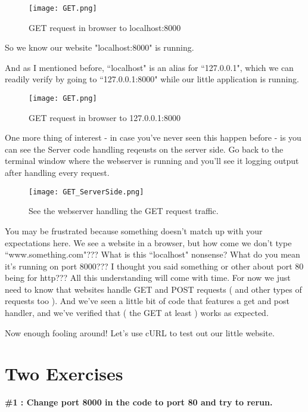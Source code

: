 \documentclass[10pt]{article}
\begin{document}
\begin{figure}[h]
  \centering
    \texttt{[image: GET.png]}
  \caption{GET request in browser to localhost:8000}
\end{figure}

So we know our website "localhost:8000" is running.

And as I mentioned before, ``localhost" is an alias for ``127.0.0.1", which we can readily verify by going to ``127.0.0.1:8000" while our little application is running.

\begin{figure}[h]
  \centering
    \texttt{[image: GET.png]}
  \caption{GET request in browser to 127.0.0.1:8000 }
\end{figure}

One more thing of interest - in case you've never seen this happen before - is you can see the Server code handling reqeusts on the server side. Go back to the terminal window where the webserver is running and you'll see it logging output after handling every request.

\begin{figure}[h]
  \centering
    \texttt{[image: GET\_ServerSide.png]}
  \caption{See the webserver handling the GET request traffic. }
\end{figure}

You may be frustrated because something doesn't match up with your expectations here. We see a website in a browser, but how come we don't type ``www.something.com"??? What is this ``localhost" nonsense? What do you mean it's running on port 8000??? I thought you said something or other about port 80 being for http??? All this understanding will come with time. For now we just need to know that websites handle GET and POST requests ( and other types of requests too ). And we've seen a little bit of code that features a get and post handler, and we've verified that ( the GET at least ) works as expected.

Now enough fooling around! Let's use cURL to test out our little website.

\section{Two Exercises}
\begin{center}
\textbf{ \#1 : Change port 8000 in the code to port 80 and try to rerun.}
\end{center}
\end{document}
